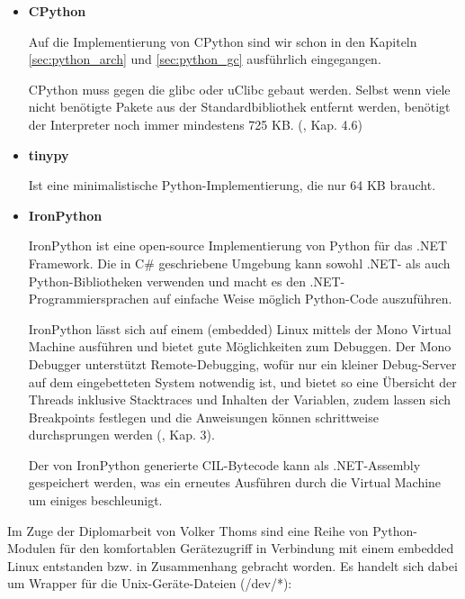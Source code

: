 \begin{itemize}

  \item \textbf{CPython}

        Auf die Implementierung von CPython sind wir schon in den Kapiteln
        \ref{sec:python_arch} und \ref{sec:python_gc} ausführlich eingegangen.

        CPython muss gegen die glibc oder uClibc gebaut werden. Selbst wenn
        viele nicht benötigte Pakete aus der Standardbibliothek entfernt
        werden, benötigt der Interpreter noch immer mindestens 725 KB.
        (\cite{embeddedlinux}, Kap. 4.6)

  \item \textbf{tinypy}

        Ist eine minimalistische Python-Implementierung, die nur 64 KB braucht.\cite{tinypy}

  \item \textbf{IronPython}

        IronPython ist eine open-source Implementierung von Python für das
        .NET Framework. Die in C\# geschriebene Umgebung kann sowohl .NET-
        als auch Python-Bibliotheken verwenden und macht es den
        .NET-Programmiersprachen auf einfache Weise möglich Python-Code
        auszuführen.

        IronPython lässt sich auf einem (embedded) Linux mittels der Mono
        Virtual Machine ausführen und bietet gute Möglichkeiten zum Debuggen.
        Der Mono Debugger unterstützt Remote-Debugging, wofür nur ein kleiner
        Debug-Server auf dem eingebetteten System notwendig ist, und bietet so
        eine Übersicht der Threads inklusive Stacktraces und Inhalten der
        Variablen, zudem lassen sich Breakpoints festlegen und die Anweisungen
        können schrittweise durchsprungen werden (\cite{ironpython}, Kap. 3).

        Der von IronPython generierte CIL-Bytecode kann als .NET-Assembly
        gespeichert werden, was ein erneutes Ausführen durch die Virtual
        Machine um einiges beschleunigt.

\end{itemize}


Im Zuge der Diplomarbeit von Volker Thoms \cite{dipl} sind eine Reihe von
Python-Modulen für den komfortablen Gerätezugriff in Verbindung mit einem
embedded Linux entstanden bzw. in Zusammenhang gebracht worden. Es handelt sich dabei
um Wrapper für die Unix-Geräte-Dateien (/dev/*):


